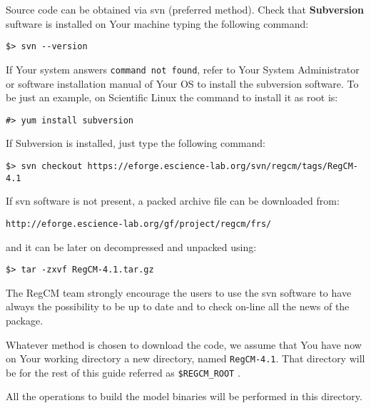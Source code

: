 %
%

Source code can be obtained via svn (preferred method).
Check that {\bf Subversion} suftware is installed on Your machine typing
the following command:

\begin{verbatim}
$> svn --version
\end{verbatim}

If Your system answers \verb=command not found=, refer to Your System
Administrator or software installation manual of Your OS to install the
subversion software. To be just an example, on Scientific Linux the command
to install it as root is:

\begin{verbatim}
#> yum install subversion
\end{verbatim}

If Subversion is installed, just type the following command:

\begin{verbatim}
$> svn checkout https://eforge.escience-lab.org/svn/regcm/tags/RegCM-4.1
\end{verbatim}

If svn software is not present, a packed archive file can be downloaded from:

\begin{Verbatim}
http://eforge.escience-lab.org/gf/project/regcm/frs/
\end{Verbatim}

and it can be later on decompressed and unpacked using:

\begin{Verbatim}
$> tar -zxvf RegCM-4.1.tar.gz
\end{Verbatim}

The RegCM team strongly encourage the users to use the svn software to have
always the possibility to be up to date and to check on-line all the news of
the package.

Whatever method is chosen to download the code, we assume that You have now
on Your working directory a new directory, named \verb=RegCM-4.1=.
That directory will be for the rest of this guide referred as 
\verb=$REGCM_ROOT= .

All the operations to build the model binaries will be performed in this
directory.
